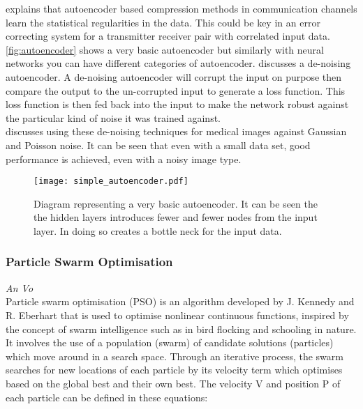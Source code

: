         \autocite{8820761} explains that autoencoder based compression methods in communication channels learn the statistical regularities in the data. This could be key in an error correcting system for a transmitter receiver pair with correlated input data.
        \\
        
        \autoref{fig:autoencoder} shows a very basic autoencoder but similarly with neural networks you can have different categories of autoencoder. \autocite{9058605} discusses a de-noising autoencoder. A de-noising autoencoder will corrupt the input on purpose then compare the output to the un-corrupted input to generate a loss function. This loss function is then fed back into the input to make the network robust against the particular kind of noise it was trained against.
        \\
        
        \cite{7836672} discusses using these de-noising techniques for medical images against Gaussian and Poisson noise. It can be seen that even with a small data set, good performance is achieved, even with a noisy image type.
        \\
        
        \begin{figure}[H]
            \centering
            \texttt{[image: simple\_autoencoder.pdf]}
            \caption{Diagram representing a very basic autoencoder. It can be seen the the hidden layers introduces fewer and fewer nodes from the input layer. In doing so creates a bottle neck for the input data.}
            \label{fig:autoencoder}
        \end{figure}
        
    \subsubsection{Particle Swarm Optimisation}
    \label{sec:particle_swarm_optimization_theory}
    \hspace*{0pt}\hfill \textit{An Vo}\\
    
        Particle swarm optimisation (PSO) is an algorithm developed by J. Kennedy and R. Eberhart \autocite{488968} that is used to optimise nonlinear continuous functions, inspired by the concept of swarm intelligence such as in bird flocking and schooling in nature. It involves the use of a population (swarm) of candidate solutions (particles) which move around in a search space. Through an iterative process, the swarm searches for new locations of each particle by its velocity term which optimises based on the global best and their own best. The velocity V and position P of each particle can be defined in these equations:
        
